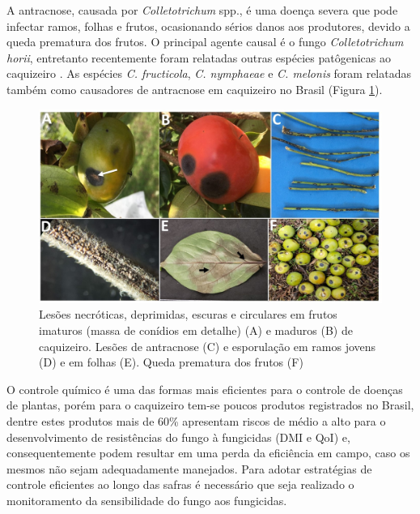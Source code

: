 \documentclass[a4paper,]{book}
\begin{document}
A antracnose, causada por \emph{Colletotrichum} spp., é uma doença
severa que pode infectar ramos, folhas e frutos, ocasionando sérios
danos aos produtores, devido a queda prematura dos frutos. O principal
agente causal é o fungo \emph{Colletotrichum horii}, entretanto
recentemente foram relatadas outras espécies patôgenicas ao caquizeiro
\citep{maydemio2015, blood2015}. As espécies \emph{C. fructicola},
\emph{C. nymphaeae} e \emph{C. melonis} foram relatadas também como
causadores de antracnose em caquizeiro no Brasil \citep{carraro2019}
(Figura \ref{fig:prancha-1}).






\begin{figure}

{\centering \includegraphics[width=1\linewidth]{./tac/prancha_1} 

}

\caption{Lesões necróticas, deprimidas, escuras e circulares em
frutos imaturos (massa de conídios em detalhe) (A) e maduros (B) de
caquizeiro. Lesões de antracnose (C) e esporulação em ramos jovens (D) e
em folhas (E). Queda prematura dos frutos (F)}\label{fig:prancha-1}
\end{figure}

O controle químico é uma das formas mais eficientes para o controle de
doenças de plantas, porém para o caquizeiro tem-se poucos produtos
registrados no Brasil, dentre estes produtos mais de 60\% apresentam
riscos de médio a alto para o desenvolvimento de resistências do fungo à
fungicidas (DMI e QoI) e, consequentemente podem resultar em uma perda
da eficiência em campo, caso os mesmos não sejam adequadamente
manejados. Para adotar estratégias de controle eficientes ao longo das
safras é necessário que seja realizado o monitoramento da sensibilidade
do fungo aos fungicidas.
\end{document}
